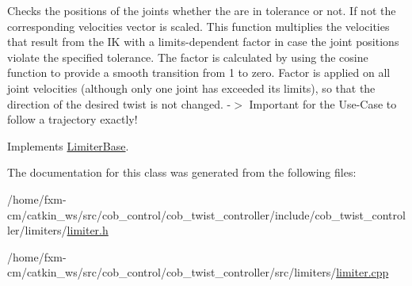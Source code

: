 Checks the positions of the joints whether the are in tolerance or not. If not the corresponding velocities vector is scaled. This function multiplies the velocities that result from the I\-K with a limits-\/dependent factor in case the joint positions violate the specified tolerance. The factor is calculated by using the cosine function to provide a smooth transition from 1 to zero. Factor is applied on all joint velocities (although only one joint has exceeded its limits), so that the direction of the desired twist is not changed. -\/$>$ Important for the Use-\/\-Case to follow a trajectory exactly! 

Implements \hyperlink{classLimiterBase_a1755edebc0cacfd79f945852ead8ae04}{Limiter\-Base}.



The documentation for this class was generated from the following files\-:\begin{DoxyCompactItemize}
\item 
/home/fxm-\/cm/catkin\-\_\-ws/src/cob\-\_\-control/cob\-\_\-twist\-\_\-controller/include/cob\-\_\-twist\-\_\-controller/limiters/\hyperlink{limiter_8h}{limiter.\-h}\item 
/home/fxm-\/cm/catkin\-\_\-ws/src/cob\-\_\-control/cob\-\_\-twist\-\_\-controller/src/limiters/\hyperlink{limiter_8cpp}{limiter.\-cpp}\end{DoxyCompactItemize}

